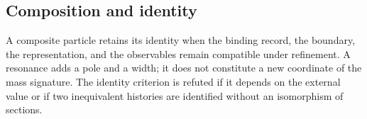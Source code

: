 \let\clearpage\relax

\endgroup
\begingroup
\let\chapter\section
\let\section\subsection
\let\subsection\subsubsection
\let\subsubsection\paragraph
\let\clearpage\relax

\endgroup

\section{Composition and identity}
A composite particle retains its identity when the binding record, the
boundary, the representation, and the observables remain compatible under
refinement. A resonance adds a pole and a width; it does not constitute a
new coordinate of the mass signature. The identity criterion is refuted
if it depends on the external value or if two inequivalent histories are identified
without an isomorphism of sections.
